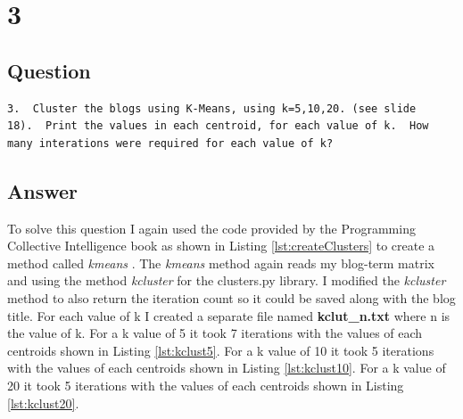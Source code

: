 \documentclass[letterpaper,11pt]{article}
\newcommand*{\srcPath}{../src}%
\begin{document}

\section*{3}

\subsection*{Question}

\begin{verbatim}
3.  Cluster the blogs using K-Means, using k=5,10,20. (see slide
18).  Print the values in each centroid, for each value of k.  How
many interations were required for each value of k?
\end{verbatim}

\subsection*{Answer}

To solve this question I again used the code provided by the Programming Collective Intelligence book as shown in Listing \ref{lst:createClusters} to create a method called \textit{kmeans} \cite{collectiveIntell}. The \textit{kmeans} method again reads my blog-term matrix and using the method \textit{kcluster} for the clusters.py library. I modified the \textit{kcluster} method to also return the iteration count so it could be saved along with the blog title. For each value of k I created a separate file named \textbf{kclut\_n.txt} where n is the value of k. For a k value of 5 it took 7 iterations with the values of each centroids shown in Listing \ref{lst:kclust5}. For a k value of 10 it took 5 iterations with the values of each centroids shown in Listing \ref{lst:kclust10}. For a k value of 20 it took 5 iterations with the values of each centroids shown in Listing \ref{lst:kclust20}.

 

 

 
\end{document}

